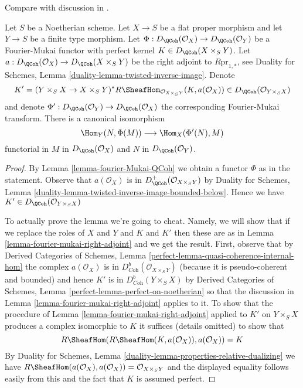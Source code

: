\begin{lemma}
\label{lemma-fourier-mukai-left-adjoint}
\begin{reference}
Compare with discussion in \cite{Rizzardo}.
\end{reference}
Let $S$ be a Noetherian scheme. Let $X \to S$ be a flat proper
morphism and let $Y \to S$ be a finite type morphism. Let
$\Phi : D_\QCoh(\mathcal{O}_X) \to D_\QCoh(\mathcal{O}_Y)$
be a Fourier-Mukai functor with perfect kernel
$K \in D_\QCoh(X \times_S Y)$.
Let $a : D_\QCoh(\mathcal{O}_X) \to  D_\QCoh(X \times_S Y)$
be the right adjoint to $R\text{pr}_{1, *}$, see
Duality for Schemes, Lemma \ref{duality-lemma-twisted-inverse-image}.
Denote
$$
K' = (Y \times_S X \to X \times_S Y)^*
R\SheafHom_{\mathcal{O}_{X \times_S Y}}(K, a(\mathcal{O}_X)) \in
D_\QCoh(\mathcal{O}_{Y \times_S X})
$$
and denote $\Phi' : D_\QCoh(\mathcal{O}_Y) \to D_\QCoh(\mathcal{O}_X)$
the corresponding Fourier-Mukai transform. There is a canonical
isomorphism
$$
\Hom_Y(N, \Phi(M)) \longrightarrow \Hom_X(\Phi'(N), M)
$$
functorial in $M$ in $D_\QCoh(\mathcal{O}_X)$ and $N$ in
$D_\QCoh(\mathcal{O}_Y)$.
\end{lemma}

\begin{proof}
By Lemma \ref{lemma-fourier-Mukai-QCoh} we obtain a functor $\Phi$
as in the statement. Observe that $a(\mathcal{O}_X)$ is in
$D^+_\QCoh(\mathcal{O}_{X \times_S Y})$ by Duality for Schemes,
Lemma \ref{duality-lemma-twisted-inverse-image-bounded-below}.
Hence we have $K' \in D_\QCoh(\mathcal{O}_{Y \times_S X})$

\medskip\noindent
To actually prove the lemma we're going to cheat. Namely, we will
show that if we replace the roles of $X$ and $Y$ and $K$ and $K'$
then these are as in Lemma \ref{lemma-fourier-mukai-right-adjoint}
and we get the result. First, observe that by
Derived Categories of Schemes, Lemma
\ref{perfect-lemma-quasi-coherence-internal-hom}
the complex $a(\mathcal{O}_X)$ is in
$D^b_{\textit{Coh}}(\mathcal{O}_{X \times_S Y})$
(because it is pseudo-coherent and bounded) and
hence $K'$ is in $D^b_{\textit{Coh}}(Y \times_S X)$
by Derived Categories of Schemes, Lemma
\ref{perfect-lemma-perfect-on-noetherian}
so that the discussion in Lemma \ref{lemma-fourier-mukai-right-adjoint}
applies to it. To show that the procedure of
Lemma \ref{lemma-fourier-mukai-right-adjoint} applied to $K'$ on $Y \times_S X$
produces a complex isomorphic to $K$ it suffices
(details omitted) to show that
$$
R\SheafHom(R\SheafHom(K, a(\mathcal{O}_X)), a(\mathcal{O}_X)) = K
$$
By Duality for Schemes, Lemma \ref{duality-lemma-properties-relative-dualizing}
we have $R\SheafHom(a(\mathcal{O}_X), a(\mathcal{O}_X)) =
\mathcal{O}_{X \times_S Y}$ and the displayed equality follows easily
from this and the fact that $K$ is assumed perfect.
\end{proof}















